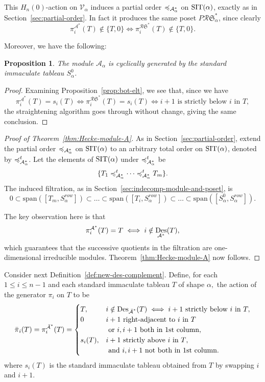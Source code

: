 \documentclass[12pt,letterpaper]{amsart}
\newcommand{\svw}{\textcolor{black}}
\newtheorem{proposition}[theorem]{Proposition}
\theoremstyle{definition}
\newcommand{\rdI}{\mathcal{R}\mathfrak{S}^*}
\DeclareMathOperator{\Des}{Des}
\newcommand{\hn}{H_n(0)}
\begin{document}
This $\hn$-action on $\mathcal{V}_\alpha$ induces a partial order $\preccurlyeq_{\mathcal{A}^\ast _\alpha}$ on $\operatorname{SIT}(\alpha)$, exactly as in Section~\ref{sec:partial-order}.
 In fact it produces the same poset $P\rdI_\alpha$, since clearly 
\[\pi_i^{{\mathcal A}^*}(T)\notin \{T, 0\} \iff \pi_i^{\rdI}(T)\notin \{T, 0\} .\]  

Moreover, we have the following:
\begin{proposition}\label{prop:cyclic-A} The module $\mathcal{A}_\alpha$ is cyclically generated by the standard immaculate tableau $S^0_\alpha$.
\end{proposition}
\begin{proof}  Examining  Proposition~\ref{prop:bot-elt}, we see that, since we have 
\[\pi_i^{{\mathcal A}^*}(T)=s_i(T)\iff \pi_i^{\rdI}(T)=s_i(T)\iff i+1 \text{ is strictly below $i$ in $T$},\]
the straightening algorithm goes through without change, giving the same conclusion.
\end{proof}
\begin{proof}[Proof of Theorem~\ref{thm:Hecke-module-A}]

As in Section~\ref{sec:partial-order}, 
 extend the partial order $\preccurlyeq_{\mathcal{A}^\ast _\alpha}$ on $\operatorname{SIT} (\alpha)$ to an arbitrary total order on $\operatorname{SIT} (\alpha)$, denoted by $\preccurlyeq_{\mathcal{A}^\ast _\alpha}^t$.   Let the elements of $\operatorname{SIT} (\alpha)$ under $\preccurlyeq_{\mathcal{A}^\ast _\alpha} ^t$ be $$\{{T} _1 \preccurlyeq_{\mathcal{A}^\ast _\alpha}^t  \cdots \preccurlyeq_{\mathcal{A}^\ast _\alpha} ^t {T} _m  \}.$$ 
The induced filtration, as in Section~\ref{sec:indecomp-module-and-poset}, is
\[ 0\subset \mathrm{span}([T_m,S^{row}_\alpha]) 
\subset\dots\subset \mathrm{span}([T_i,S^{row}_\alpha])\subset \dots \subset 
\mathrm{span}([S^0_\alpha, S^{row}_\alpha]).\]

  The key observation here is that
 \[\svw{\pi_i^{\mathcal{A}^*}}(T)=T\iff i\notin \svw{\Des_{\mathcal{A}^*}(T),}\]
which guarantees that the successive quotients in the filtration are one-dimensional irreducible modules.
Theorem~\ref{thm:Hecke-module-A} now follows.\end{proof}

Consider next Definition~\ref{def:new-des-complement}.
Define, for each $1\le i\le n-1$ and each standard immaculate tableau $T$ of shape $\alpha,$ the action of the generator $\pi_i$ on $T$ to be 
\[\bpi_i(T)=\pi_i^{\bA^*}(T)=\begin{cases} T, & 
i\notin \Des_{\bA^*}(T)\iff i+1 \text{ strictly below } i \text{ in } T, \\
0 & i+1 \text{  right-adjacent to $i$ in $T$} \\
&\text{ or $i, i+1$ both in 1st column}, \\
s_i(T), &   i+1 \text{ strictly above $i$ in $T$}, \\
&\text{ and } i, i+1 \text{ not both in 1st column}. 
\end{cases}\]
where $s_i(T)$ is the standard immaculate tableau obtained from $T$ by swapping $i$ and $i+1.$ 
\end{document}
